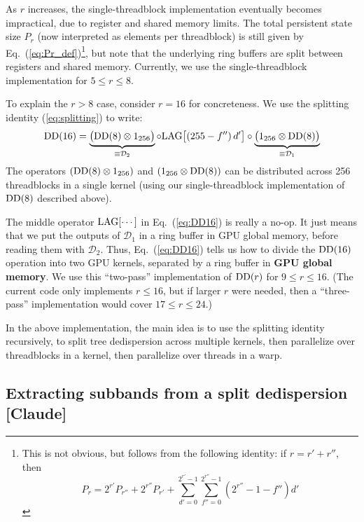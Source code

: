 \documentclass{article}
\numberwithin{equation}{section}   %
\def\DD{{\rm DD}}
\def\LAG{{\rm LAG}}
\begin{document}
As $r$ increases, the single-threadblock implementation eventually becomes impractical,
due to register and shared memory limits.
The total persistent state size $P_r$ (now interpreted as elements per threadblock) 
is still given by Eq.\ (\ref{eq:Pr_def})\footnote{This is not obvious, but follows from
the following identity: if $r=r'+r''$, then
\begin{equation}
P_r = 2^{r'} P_{r''} + 2^{r''} P_{r'} 
+ \sum_{d'=0}^{2^{r'}-1} \sum_{f''=0}^{2^{r''}-1} (2^{r''}-1-f'') d'
\end{equation}}, but note that the underlying ring buffers
are split between registers and shared memory.
Currently, we use the single-threadblock implementation for $5 \le r \le 8$.

To explain the $r > 8$ case, consider $r=16$ for concreteness.
We use the splitting identity (\ref{eq:splitting}) to write:
\begin{equation}
\DD(16) = \underbrace{\big( \DD(8) \otimes 1_{256} \big)}_{\equiv {\mathcal D}_2}
   \circ \LAG\big[ (255-f'') \, d' \big] 
   \circ \underbrace{\big( 1_{256} \otimes \DD(8) \big)}_{\equiv {\mathcal D}_1}
\label{eq:DD16}
\end{equation}
The operators $(\DD(8) \otimes 1_{256})$ and $(1_{256} \otimes \DD(8))$ can be distributed
across 256 threadblocks in a single kernel (using our single-threadblock implementation 
of $\DD(8)$ described above).

The middle operator $\LAG[\cdots]$ in Eq.\ (\ref{eq:DD16}) is really a no-op.
It just means that we put the outputs of ${\mathcal D}_1$ in a ring buffer in GPU global memory,
before reading them with ${\mathcal D}_2$.
Thus, Eq.\ (\ref{eq:DD16}) tells us how to divide the $\DD(16)$ operation into two GPU kernels,
separated by a ring buffer in {\bf GPU global memory}.
We use this ``two-pass'' implementation of $\DD(r)$ for $9 \le r \le 16$.
(The current code only implements $r \le 16$, but if larger $r$ were needed, then a ``three-pass''
implementation would cover $17 \le r \le 24$.)

In the above implementation, the main idea is to use the splitting identity recursively, to
split tree dedispersion across multiple kernels, then parallelize over threadblocks in a kernel,
then parallelize over threads in a warp.

\subsection{Extracting subbands from a split dedispersion [Claude]}
\label{ssec:subband_extraction}
\end{document}

